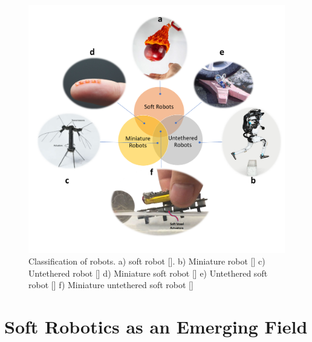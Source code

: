 \begin{figure}[t]
      \centering
      \includegraphics[width=\textwidth]{venn.pdf}
      \caption{Classification of robots. a) soft robot []. b) Miniature robot [] c) Untethered robot [] d) Miniature soft robot [] e) Untethered soft robot [] f) Miniature untethered soft robot []}
      \label{fig:venn}
\end{figure}

\section{Soft Robotics as an Emerging Field}
\label{sec:emerging}


